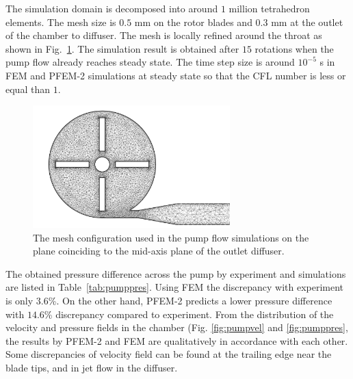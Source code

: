 The simulation domain is decomposed into around $1$ million tetrahedron elements. The mesh size is $0.5$ mm on the rotor blades and $0.3$ mm at the outlet of the chamber to diffuser. The mesh is locally refined around the throat as shown in Fig.~\ref{fig:pumpmesh}. The simulation result is obtained after $15$ rotations when the pump flow already reaches steady state. The time step size is around $10^{-5}$ s in FEM and PFEM-2 simulations at steady state so that the CFL number is less or equal than $1$.  

\begin{figure}[htbp]
    \centering
    \includegraphics[width=3in]{imgs/nozzle_pump/pump_mesh_2.pdf}
    \caption{The mesh configuration used in the pump flow simulations on the plane coinciding to the mid-axis plane of the outlet diffuser.}
    \label{fig:pumpmesh}
\end{figure}

The obtained pressure difference across the pump by experiment and simulations are listed in Table~\ref{tab:pumppres}. Using FEM the discrepancy with experiment is only $3.6$\%. On the other hand, PFEM-2 predicts a lower pressure difference with $14.6$\% discrepancy compared to experiment. From the distribution of the velocity and pressure fields in the chamber (Fig. \ref{fig:pumpvel} and \ref{fig:pumppres}, the results by PFEM-2 and FEM are qualitatively in accordance with each other. Some discrepancies of velocity field can be found at the trailing edge near the blade tips, and in jet flow in the diffuser. 


